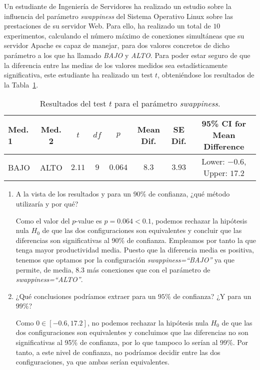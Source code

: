 \begin{ejercicio}\label{ej:4.18}
Un estudiante de Ingeniería de Servidores ha realizado un estudio sobre la influencia del parámetro \emph{swappiness} del Sistema Operativo Linux sobre las prestaciones de su servidor Web. Para ello, ha realizado un total de $10$ experimentos, calculando el número máximo de conexiones simultáneas que su servidor Apache es capaz de manejar, para dos valores concretos de dicho parámetro a los que ha llamado \emph{BAJO} y \emph{ALTO}. Para poder estar seguro de que la diferencia entre las medias de los valores medidos sea estadísticamente significativa, este estudiante ha realizado un test $t$, obteniéndose los resultados de la Tabla~\ref{tab:ej:4.18}.
\begin{table}[h]
\centering
\begin{tabular}{@{}lccccccc@{}}
\toprule
Med. 1 & Med. 2 & $t$ & $df$ & $p$ & Mean Dif. & SE Dif. & 95\% CI for Mean Difference \\ \midrule
BAJO & ALTO & $2.11$ & $9$ & $0.064$ & $8.3$ & $3.93$ & Lower: $-0.6$, Upper: $17.2$ \\ \bottomrule
\end{tabular}
\caption{Resultados del test $t$ para el parámetro \emph{swappiness}.}
\label{tab:ej:4.18}
\end{table}
\begin{enumerate}
    \item A la vista de los resultados y para un $90\%$ de confianza, ¿qué método utilizaría y por qué?
    
    Como el valor del $p$-value es $p=0.064<0.1$, podemos rechazar la hipótesis nula $H_0$ de que las dos configuraciones son equivalentes y concluir que las diferencias son significativas al 90\% de confianza. Empleamos por tanto la que tenga mayor productividad media. Puesto que la diferencia media es positiva, tenemos que optamos por la configuración \emph{swappiness=``BAJO''} ya que permite, de media, $8.3$ más conexiones que con el parámetro de \emph{swappiness=``ALTO''}.
    \item ¿Qué conclusiones podríamos extraer para un $95\%$ de confianza? ¿Y para un $99\%$?
    
    Como $0\in [-0.6, 17.2]$, no podemos rechazar la hipótesis nula $H_0$ de que las dos configuraciones son equivalentes y concluimos que las diferencias no son significativas al 95\% de confianza, por lo que tampoco lo serían al 99\%. Por tanto, a este nivel de confianza, no podríamos decidir entre las dos configuraciones, ya que ambas serían equivalentes.
\end{enumerate}
\end{ejercicio}
\begin{comment}Sol:
a) Hay diferencias significativas ($p$-value $< 0.1$). Debo usar \emph{swappiness="BAJO"} ya que permite, de media, $8.3$ más conexiones que con el parámetro de \emph{swappiness="ALTO"}.
b) En ambos casos las diferencias no son significativas ($p$-value $> 0.05$ y $p$-value $> 0.01$).
\end{comment}

